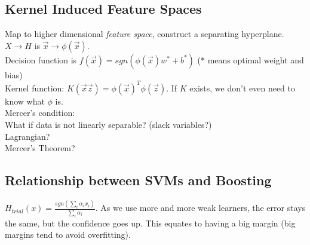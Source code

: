 \documentclass[titlepage,11pt]{article}
\begin{document}
\subsection{Kernel Induced Feature Spaces}
Map to higher dimensional \textit{feature space}, construct a separating hyperplane. $X \rightarrow H$ is $\vec{x} \rightarrow \phi(\vec{x}).$\\
Decision function is $f(\vec{x}) = sgn (\phi(\vec{x}) w^*+b^*)$ (* means optimal weight and bias)\\
Kernel function: $K(\vec{x} \vec{z}) =\phi(\vec{x})^T\phi(\vec{z})$. If $K$ exists, we don't even need to know what $\phi$ is.\\
Mercer's condition: \\
What if data is not linearly separable? (slack variables?)\\
Lagrangian?\\
Mercer's Theorem? \\

\subsection{Relationship between SVMs and Boosting}
$H_{trial} (x) = \frac{sgn(\sum_i{\alpha_i x_i})}{\sum_i \alpha_i}$. As we use more and more weak learners, the error stays the same, but the confidence goes up. This equates to having a big margin (big margins tend to avoid overfitting). 
\end{document}
